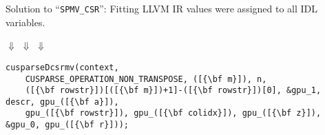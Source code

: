 \vspace{-1.8mm}
\caption{Solution to ``{\tt SPMV\_CSR}'': Fitting LLVM IR values were assigned
         to all IDL variables.\leftskip=0pt\rightskip=0pt}
\label{fig:spmvexample2}

\vspace{3.25mm}
{{\Huge$\Downarrow$}
\hspace{-2.73mm}\phantom{\bf~~~Code Generation: Insert~~}\hspace{-3.69mm}
{\Huge$\Downarrow$}
\hspace{-2.73mm}\phantom{\bf~~Arguments, Replace Code~~~}\hspace{-3.69mm}
{\Huge$\Downarrow$}}
\hspace{-3.4mm}

\vspace{-10.5mm}
{\phantom{\Huge$\Downarrow$}
\hspace{-2.73mm}{\bf~~~Code Generation: Insert~~}\hspace{-3.69mm}
\phantom{\Huge$\Downarrow$}
\hspace{-2.73mm}{\bf~~Arguments, Replace Code~~~}\hspace{-3.69mm}
\phantom{\Huge$\Downarrow$}}
\hspace{-3.4mm}
\vspace{-2.75mm}

\begin{lstlisting}[language=MyCpp, label={fig:spmvexample3}, caption=
   {GPU acceleration: Solution values are used to call ``{\tt cusparseDcsrmv}''
    backend.\leftskip=0pt\rightskip=0pt}]
cusparseDcsrmv(context,
    CUSPARSE_OPERATION_NON_TRANSPOSE, ([{\bf m}]), n,
    ([{\bf rowstr}])[([{\bf m}])+1]-([{\bf rowstr}])[0], &gpu_1, descr, gpu_([{\bf a}]),
    gpu_([{\bf rowstr}]), gpu_([{\bf colidx}]), gpu_([{\bf z}]), &gpu_0, gpu_([{\bf r}]));
\end{lstlisting}